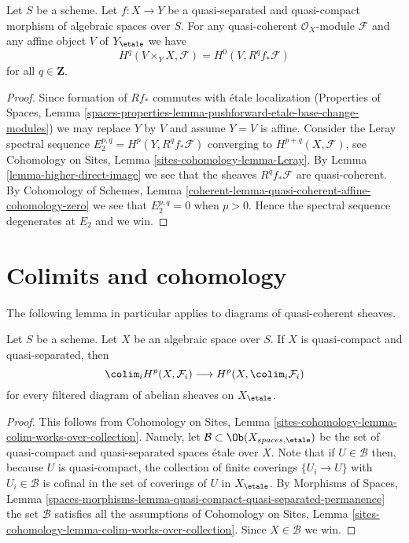\begin{lemma}
\label{lemma-quasi-coherence-higher-direct-images-application}
Let $S$ be a scheme. Let $f : X \to Y$ be a quasi-separated and quasi-compact
morphism of algebraic spaces over $S$. For any quasi-coherent
$\mathcal{O}_X$-module $\mathcal{F}$ and any affine object $V$ of
$Y_\etale$ we have
$$
H^q(V \times_Y X, \mathcal{F}) = H^0(V, R^qf_*\mathcal{F})
$$
for all $q \in \mathbf{Z}$.
\end{lemma}

\begin{proof}
Since formation of $Rf_*$ commutes with \'etale localization
(Properties of Spaces, Lemma
\ref{spaces-properties-lemma-pushforward-etale-base-change-modules})
we may replace $Y$ by $V$ and assume $Y = V$ is affine.
Consider the Leray spectral sequence
$E_2^{p, q} = H^p(Y, R^qf_*\mathcal{F})$
converging to $H^{p + q}(X, \mathcal{F})$, see
Cohomology on Sites, Lemma \ref{sites-cohomology-lemma-Leray}.
By Lemma \ref{lemma-higher-direct-image}
we see that the sheaves $R^qf_*\mathcal{F}$ are quasi-coherent. By
Cohomology of Schemes, Lemma
\ref{coherent-lemma-quasi-coherent-affine-cohomology-zero}
we see that $E_2^{p, q} = 0$ when $p > 0$.
Hence the spectral sequence degenerates at $E_2$ and we win.
\end{proof}




\section{Colimits and cohomology}
\label{section-colimits}

\noindent
The following lemma in particular applies to diagrams of quasi-coherent
sheaves.

\begin{lemma}
\label{lemma-colimits}
Let $S$ be a scheme. Let $X$ be an algebraic space over $S$.
If $X$ is quasi-compact and quasi-separated, then
$$
\colim_i H^p(X, \mathcal{F}_i)
\longrightarrow
H^p(X, \colim_i \mathcal{F}_i)
$$
for every filtered diagram of abelian sheaves on $X_\etale$.
\end{lemma}

\begin{proof}
This follows from
Cohomology on Sites, Lemma
\ref{sites-cohomology-lemma-colim-works-over-collection}.
Namely, let $\mathcal{B} \subset \Ob(X_{spaces, \etale})$
be the set of quasi-compact and quasi-separated spaces \'etale over $X$.
Note that if $U \in \mathcal{B}$ then, because $U$ is quasi-compact,
the collection of finite coverings $\{U_i \to U\}$ with $U_i \in \mathcal{B}$
is cofinal in the set of coverings of $U$ in $X_\etale$. By
Morphisms of Spaces, Lemma
\ref{spaces-morphisms-lemma-quasi-compact-quasi-separated-permanence}
the set $\mathcal{B}$ satisfies all the assumptions of
Cohomology on Sites, Lemma
\ref{sites-cohomology-lemma-colim-works-over-collection}.
Since $X \in \mathcal{B}$ we win.
\end{proof}

